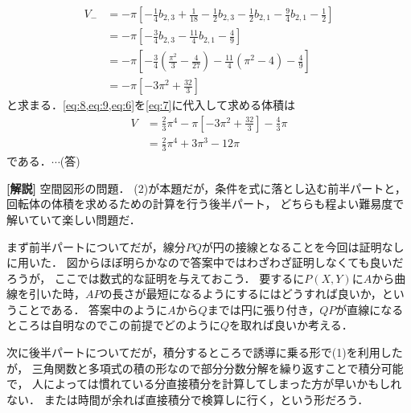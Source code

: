 \documentclass[a4paper,10pt]{ltjsarticle}
\begin{document}
\begin{multicols}{2}
\begin{align}
    V_{-}
     & = -\pi \left[ -\frac{1}{4}b_{2,3}+\frac{1}{18} - \frac{1}{2}b_{2,3} -\frac{1}{2}b_{2,1}-\frac{9}{4}b_{2,1}-\frac{1}{2} \right] \nonumber    \\
     & = -\pi \left[ -\frac{3}{4}b_{2,3} -\frac{11}{4}b_{2,1}-\frac{4}{9} \right]                                                     \nonumber    \\
     & = -\pi \left[ -\frac{3}{4}\left( \frac{\pi^2}{3} - \frac{4}{27}\right) -\frac{11}{4}\left(\pi^2-4\right)-\frac{4}{9} \right]   \nonumber    \\
     & = -\pi \left[ -3\pi^2 + \frac{32}{3}  \right]                                                                                  \label{eq:6}
  \end{align}
  と求まる．\cref{eq:8,eq:9,eq:6}を\cref{eq:7}に代入して求める体積は
  \begin{align*}
    V
     & = \frac{2}{3}\pi^4 -\pi \left[ -3\pi^2 + \frac{32}{3}  \right] - \frac{4}{3}\pi \\
     & = \frac{2}{3}\pi^4 + 3\pi^3 -12 \pi
  \end{align*}
  である．$\cdots$(答)

  \vspace{10pt}
  {\bf[解説]}
  空間図形の問題．
  (2)が本題だが，条件を式に落とし込む前半パートと，回転体の体積を求めるための計算を行う後半パート，
  どちらも程よい難易度で解いていて楽しい問題だ．

  まず前半パートについてだが，線分$PQ$が円の接線となることを今回は証明なしに用いた．
  図からほぼ明らかなので答案中ではわざわざ証明しなくても良いだろうが，
  ここでは数式的な証明を与えておこう．
  要するに$P(X,Y)$に$A$から曲線を引いた時，$AP$の長さが最短になるようにするにはどうすれば良いか，ということである．
  答案中のように$A$から$Q$までは円に張り付き，$QP$が直線になるところは自明なのでこの前提でどのように$Q$を取れば良いか考える．



  次に後半パートについてだが，積分するところで誘導に乗る形で(1)を利用したが，
  三角関数と多項式の積の形なので部分分数分解を繰り返すことで積分可能で，
  人によっては慣れている分直接積分を計算してしまった方が早いかもしれない．
  または時間が余れば直接積分で検算しに行く，という形だろう．


\end{multicols}
\end{document}
